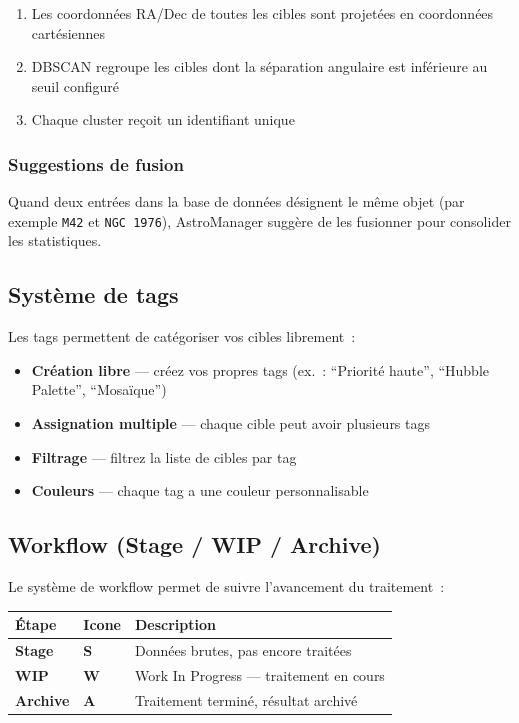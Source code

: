 \documentclass[a4paper,11pt]{article}
\begin{document}
\begin{enumerate}
    \item Les coordonn\'{e}es RA/Dec de toutes les cibles sont projet\'{e}es en coordonn\'{e}es cart\'{e}siennes
    \item DBSCAN regroupe les cibles dont la s\'{e}paration angulaire est inf\'{e}rieure au seuil configur\'{e}
    \item Chaque cluster re\c{c}oit un identifiant unique
\end{enumerate}

\subsubsection{Suggestions de fusion}

Quand deux entr\'{e}es dans la base de donn\'{e}es d\'{e}signent le m\^{e}me objet (par exemple \texttt{M42} et \texttt{NGC 1976}), AstroManager sugg\`{e}re de les fusionner pour consolider les statistiques.

\subsection{Syst\`{e}me de tags}

Les tags permettent de cat\'{e}goriser vos cibles librement~:

\begin{itemize}
    \item \textbf{Cr\'{e}ation libre} --- cr\'{e}ez vos propres tags (ex.~: ``Priorit\'{e} haute'', ``Hubble Palette'', ``Mosa\"{i}que'')
    \item \textbf{Assignation multiple} --- chaque cible peut avoir plusieurs tags
    \item \textbf{Filtrage} --- filtrez la liste de cibles par tag
    \item \textbf{Couleurs} --- chaque tag a une couleur personnalisable
\end{itemize}

\subsection{Workflow (Stage / WIP / Archive)}

Le syst\`{e}me de workflow permet de suivre l'avancement du traitement~:

\begin{center}
\begin{tabularx}{\textwidth}{l l X}
\toprule
\textbf{\'{E}tape} & \textbf{Icone} & \textbf{Description} \\
\midrule
\textbf{Stage} & \textbf{S} & Donn\'{e}es brutes, pas encore trait\'{e}es \\
\textbf{WIP} & \textbf{W} & Work In Progress --- traitement en cours \\
\textbf{Archive} & \textbf{A} & Traitement termin\'{e}, r\'{e}sultat archiv\'{e} \\
\bottomrule
\end{tabularx}
\end{center}
\end{document}
